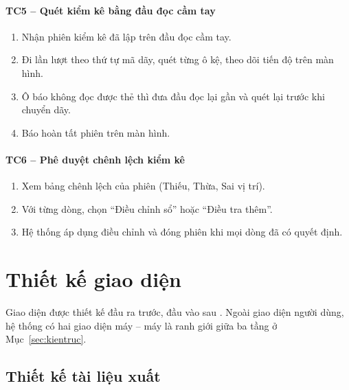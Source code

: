 \paragraph{TC5 -- Quét kiểm kê bằng đầu đọc cầm tay}
\begin{enumerate}
  \item Nhận phiên kiểm kê đã lập trên đầu đọc cầm tay.
  \item Đi lần lượt theo thứ tự mã dãy, quét từng ô kệ, theo dõi tiến độ trên màn hình.
  \item Ô báo không đọc được thẻ thì đưa đầu đọc lại gần và quét lại trước khi chuyển dãy.
  \item Báo hoàn tất phiên trên màn hình.
\end{enumerate}

\paragraph{TC6 -- Phê duyệt chênh lệch kiểm kê}
\begin{enumerate}
  \item Xem bảng chênh lệch của phiên (Thiếu, Thừa, Sai vị trí).
  \item Với từng dòng, chọn “Điều chỉnh sổ” hoặc “Điều tra thêm”.
  \item Hệ thống áp dụng điều chỉnh và đóng phiên khi mọi dòng đã có quyết định.
\end{enumerate}

\section{Thiết kế giao diện}
\label{sec:giaodien}

Giao diện được thiết kế đầu ra trước, đầu vào sau \cite[Ch.~7]{tung_qlhttt}. Ngoài giao diện người dùng, hệ thống có hai giao diện máy -- máy là ranh giới giữa ba tầng ở Mục~\ref{sec:kientruc}.

\subsection{Thiết kế tài liệu xuất}

